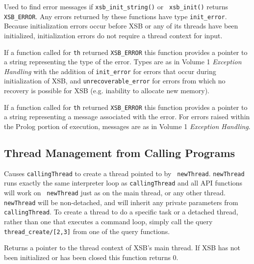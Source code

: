 \begin{description}
 
%
Used to find error messages if {\tt xsb\_init\_string()} or {\tt
  xsb\_init()} returns {\tt XSB\_ERROR}.  Any errors returned by these
functions have type {\tt init\_error}.  Because initialization errors
occur before XSB or any of its threads have been initialized,
initialization errors do not require a thread context for input.

 
%
If a function called for {\tt th} returned {\tt XSB\_ERROR} this
function provides a pointer to a string representing the type of the
error.  Types are as in Volume 1 {\em Exception Handling} with the
addition of {\tt init\_error} for errors that occur during
initialization of XSB, and {\tt unrecoverable\_error} for errors from
which no recovery is possible for XSB (e.g. inability to allocate new
memory).  

%
If a function called for {\tt th} returned {\tt XSB\_ERROR} this
function provides a pointer to a string representing a message
associated with the error.  For errors raised within the Prolog
portion of execution, messages are as in Volume 1 {\em Exception
  Handling}.

\end{description}

\subsection{Thread Management from Calling Programs}

\begin{description}

%
Causes {\tt callingThread} to create a thread pointed to by {\tt
  newThread}.  {\tt newThread} runs exactly the same interpreter loop
as {\tt callingThread} and all API functions will work on {\tt
  newThread} just as on the main thread, or any other thread.  {\tt
  newThread} will be non-detached, and will inherit any private
parameters from {\tt callingThread}.  To create a thread to do a
specific task or a detached thread, rather than one that executes a
command loop, simply call the query {\tt thread\_create/[2,3]} from
one of the query functions.

%
Returns a pointer to the thread context of XSB's main thread.  If XSB
has not been initialized or has been closed this function returns 0.



\end{description}

